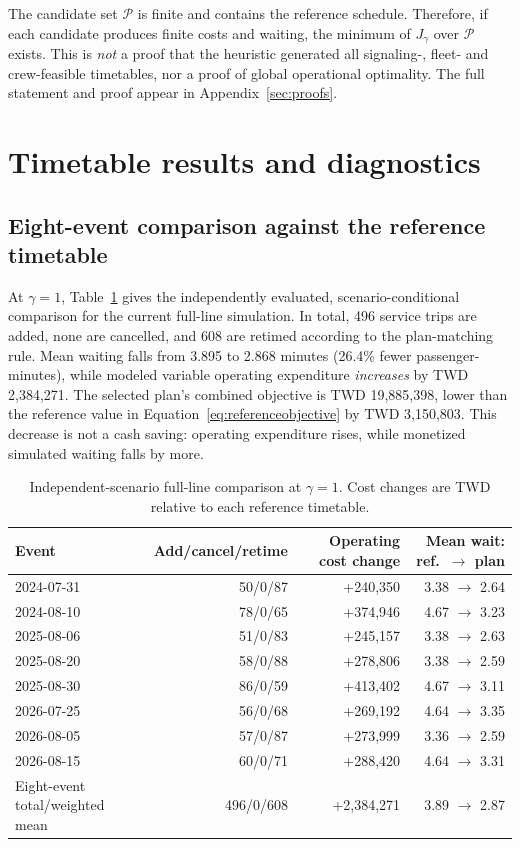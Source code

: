 The candidate set $\mathcal P$ is finite and contains the reference schedule. Therefore, if each candidate produces finite costs and waiting, the minimum of $J_\gamma$ over $\mathcal P$ exists. This is \emph{not} a proof that the heuristic generated all signaling-, fleet- and crew-feasible timetables, nor a proof of global operational optimality. The full statement and proof appear in Appendix~\ref{sec:proofs}.

\section{Timetable results and diagnostics}
\subsection{Eight-event comparison against the reference timetable}
At $\gamma=1$, Table~\ref{tab:dispatch} gives the independently evaluated, scenario-conditional comparison for the current full-line simulation. In total, 496 service trips are added, none are cancelled, and 608 are retimed according to the plan-matching rule. Mean waiting falls from 3.895 to 2.868 minutes (26.4\% fewer passenger-minutes), while modeled variable operating expenditure \emph{increases} by TWD 2,384,271. The selected plan's combined objective is TWD 19,885,398, lower than the reference value in Equation~\eqref{eq:referenceobjective} by TWD 3,150,803. This decrease is not a cash saving: operating expenditure rises, while monetized simulated waiting falls by more.
\begin{table}[htbp]\centering\small
\caption{Independent-scenario full-line comparison at $\gamma=1$. Cost changes are TWD relative to each reference timetable.}
\label{tab:dispatch}
\begin{tabular}{lrrr}\toprule
Event & Add/cancel/retime & Operating cost change & Mean wait: ref.\ $\to$ plan\\\midrule
2024-07-31 & 50/0/87 & +240,350 & 3.38 $\to$ 2.64\\
2024-08-10 & 78/0/65 & +374,946 & 4.67 $\to$ 3.23\\
2025-08-06 & 51/0/83 & +245,157 & 3.38 $\to$ 2.63\\
2025-08-20 & 58/0/88 & +278,806 & 3.38 $\to$ 2.59\\
2025-08-30 & 86/0/59 & +413,402 & 4.67 $\to$ 3.11\\
2026-07-25 & 56/0/68 & +269,192 & 4.64 $\to$ 3.35\\
2026-08-05 & 57/0/87 & +273,999 & 3.36 $\to$ 2.59\\
2026-08-15 & 60/0/71 & +288,420 & 4.64 $\to$ 3.31\\\midrule
Eight-event total/weighted mean & 496/0/608 & +2,384,271 & 3.89 $\to$ 2.87\\\bottomrule
\end{tabular}
\end{table}

